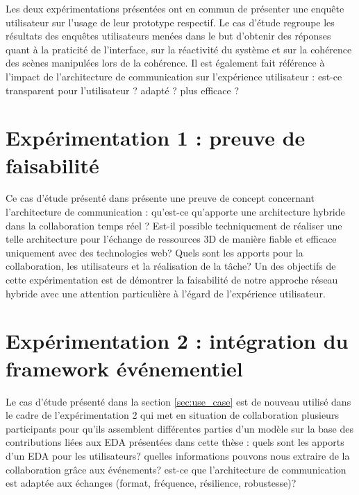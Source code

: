 Les deux expérimentations présentées ont en commun de présenter une enquête 
utilisateur sur l'usage de leur prototype respectif. Le cas d'étude regroupe les 
résultats des enquêtes utilisateurs menées dans le but d'obtenir des réponses 
quant à la praticité de l'interface, sur la réactivité du système et sur la 
cohérence des scènes manipulées lors de la cohérence. Il est également fait 
référence à l'impact de l'architecture de communication sur l'expérience utilisateur 
: est-ce transparent pour l'utilisateur ? adapté ? plus efficace ?




\section{Expérimentation 1 : preuve de faisabilité}

Ce cas d'étude présenté dans \cite{Desprat2015a, Desprat2015b} présente 
une preuve de concept concernant l'architecture de communication : qu'est-ce 
qu'apporte une architecture hybride dans la collaboration temps réel ? Est-il 
possible techniquement de réaliser une 
telle architecture pour l'échange de ressources 3D de manière fiable et efficace 
uniquement avec des technologies web? Quels sont les apports pour la 
collaboration, les utilisateurs et la réalisation de la tâche?
Un des objectifs de cette expérimentation est de démontrer la faisabilité de notre 
approche réseau hybride avec une attention particulière à l'égard de l'expérience 
utilisateur.



\section{Expérimentation 2 : intégration du framework événementiel}
\label{sec:xp2}

Le cas d'étude présenté dans la section \ref{sec:use_case} est de nouveau utilisé 
dans le cadre de l'expérimentation 2 qui met en situation de collaboration plusieurs 
participants pour qu'ils assemblent différentes parties d'un modèle sur la base des 
contributions liées aux \gls{EDA} présentées dans cette thèse : quels sont les 
apports d'un \gls{EDA} pour les utilisateurs? quelles informations pouvons nous 
extraire de la collaboration grâce aux événements? est-ce que l'architecture de 
communication est adaptée aux échanges (format, fréquence, résilience, 
robustesse)? 






